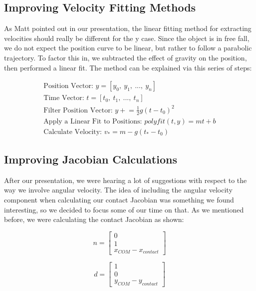 \documentclass{article}
\newcommand{\pluseq}{\mathrel{+}=}
\begin{document}
\subsection{Improving Velocity Fitting Methods}
As Matt pointed out in our presentation, the linear fitting method for extracting velocities should really be different for the y case. Since the object is in free fall, we do not expect the position curve to be linear, but rather to follow a parabolic trajectory. To factor this in, we subtracted the effect of gravity on the position, then performed a linear fit. The method can be explained via this series of steps:

\begin{align*}
    \mbox{Position Vector: } y = [y_0,\ y_1,\ ...,\ y_n] \\
    \mbox{Time Vector: } t = [t_0,\ t_1,\ ...,\ t_n] \\
    \mbox{Filter Position Vector:  } y \pluseq \frac{1}{2}g(t-t_0)^2 \\
    \mbox{Apply a  Linear Fit to Positions: } polyfit(t, y) = mt+ b \\
    \mbox{Calculate Velocity: } v_*  = m - g (t_* - t_0) 
\end{align*}



\subsection{Improving Jacobian Calculations}
After our presentation, we were hearing a lot of suggestions with respect to the way we involve angular velocity. The idea of including the angular velocity component when calculating our contact Jacobian was something we found interesting, so we decided to focus some of our time on that. As we mentioned before, we were calculating the contact Jacobian as shown: 

\begin{equation}
n = 
\begin{bmatrix} 
 0 \\
 1 \\
 x_{COM}-x_{contact} 
\end{bmatrix}
\end{equation}

\begin{equation}
d = 
\begin{bmatrix} 
 1 \\
 0 \\
 y_{COM}-y_{contact} 
\end{bmatrix}
\end{equation}
\end{document}
